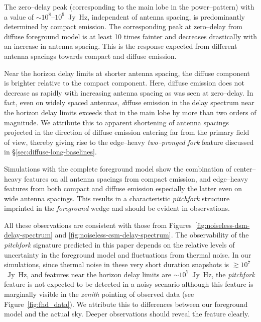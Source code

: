 \documentclass[preprint2,iop,numberedappendix]{emulateapj}
\begin{document}
The zero--delay peak (corresponding to the main lobe in the power--pattern) with a value of $\sim 10^8$--$10^9$~Jy~Hz, independent of antenna spacing, is predominantly determined by compact emission. The corresponding peak at zero--delay from diffuse foreground model is at least 10 times fainter and decreases drastically with an increase in antenna spacing. This is the response expected from different antenna spacings towards compact and diffuse emission. 

Near the horizon delay limits at shorter antenna spacing, the diffuse component is brighter relative to the compact component. Here, diffuse emission does not decrease as rapidly with increasing antenna spacing as was seen at zero--delay. In fact, even on widely spaced antennas, {\emph diffuse emission in the delay spectrum near the horizon delay limits exceeds that in the main lobe by more than two orders of magnitude}. We attribute this to apparent shortening of antenna spacings projected in the direction of diffuse emission entering far from the primary field of view, thereby giving rise to the edge--heavy {\it two--pronged fork} feature discussed in \S\ref{sec:diffuse-long-baselines}.

Simulations with the complete foreground model show the combination of center--heavy features on all antenna spacings from compact emission, and edge--heavy features from both compact and diffuse emission especially the latter even on wide antenna spacings.  This results in a characteristic {\it pitchfork} structure imprinted in the {\it foreground} wedge and should be evident in observations.

All these observations are consistent with those from Figures~\ref{fig:noiseless-dsm-delay-spectrum} and \ref{fig:noiseless-csm-delay-spectrum}. The observability of the {\it pitchfork} signature predicted in this paper depends on the relative levels of uncertainty in the foreground model and fluctuations from thermal noise. In our simulations, since thermal noise in these very short duration snapshots is $\gtrsim 10^7$~Jy~Hz, and features near the horizon delay limits are $\sim 10^7$~Jy~Hz, the {\it pitchfork} feature is not expected to be detected in a noisy scenario although this feature is marginally visible in the {\it zenith} pointing of observed data (see Figure~\ref{fig:fhd_data}). We attribute this to differences between our foreground model and the actual sky.  Deeper observations should reveal the feature clearly.
\end{document}
